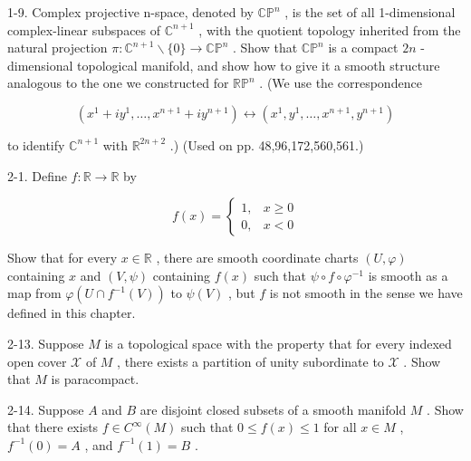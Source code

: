\begin{exercise}
\label{prob:1-9}


1-9. Complex projective n-space, denoted by ${\mathbb{{CP}}}^{n}$ , is the set of all 1-dimensional complex-linear subspaces of ${\mathbb{C}}^{n + 1}$ , with the quotient topology inherited from the natural projection $\pi  : {\mathbb{C}}^{n + 1} \smallsetminus  \{ 0\}  \rightarrow  {\mathbb{{CP}}}^{n}$ . Show that ${\mathbb{{CP}}}^{n}$ is a compact ${2n}$ -dimensional topological manifold, and show how to give it a smooth structure analogous to the one we constructed for ${\mathbb{{RP}}}^{n}$ . (We use the correspondence

\[
\left( {{x}^{1} + i{y}^{1},\ldots ,{x}^{n + 1} + i{y}^{n + 1}}\right)  \leftrightarrow  \left( {{x}^{1},{y}^{1},\ldots ,{x}^{n + 1},{y}^{n + 1}}\right)
\]

to identify ${\mathbb{C}}^{n + 1}$ with ${\mathbb{R}}^{{2n} + 2}$ .) (Used on pp. 48,96,172,560,561.)
\end{exercise}

\begin{exercise}
\label{prob:2-1}


2-1. Define $f : \mathbb{R} \rightarrow  \mathbb{R}$ by

\[
f\left( x\right)  = \left\{  \begin{array}{ll} 1, & x \geq  0 \\  0, & x < 0 \end{array}\right.
\]

Show that for every $x \in  \mathbb{R}$ , there are smooth coordinate charts $\left( {U,\varphi }\right)$ containing $x$ and $\left( {V,\psi }\right)$ containing $f\left( x\right)$ such that $\psi  \circ  f \circ  {\varphi }^{-1}$ is smooth as a map from $\varphi \left( {U \cap  {f}^{-1}\left( V\right) }\right)$ to $\psi \left( V\right)$ , but $f$ is not smooth in the sense we have defined in this chapter.
\end{exercise}

\begin{exercise}
\label{prob:2-13}


2-13. Suppose $M$ is a topological space with the property that for every indexed open cover $\mathcal{X}$ of $M$ , there exists a partition of unity subordinate to $\mathcal{X}$ . Show that $M$ is paracompact.
\end{exercise}

\begin{exercise}
\label{prob:2-14}


2-14. Suppose $A$ and $B$ are disjoint closed subsets of a smooth manifold $M$ . Show that there exists $f \in  {C}^{\infty }\left( M\right)$ such that $0 \leq  f\left( x\right)  \leq  1$ for all $x \in  M$ , ${f}^{-1}\left( 0\right)  = A$ , and ${f}^{-1}\left( 1\right)  = B$ .
\end{exercise}

